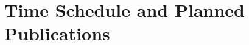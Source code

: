 \section{Time Schedule and Planned Publications}
\label{sec:Time Schedule and Planned Publications}
%

\vspace{1cm}





